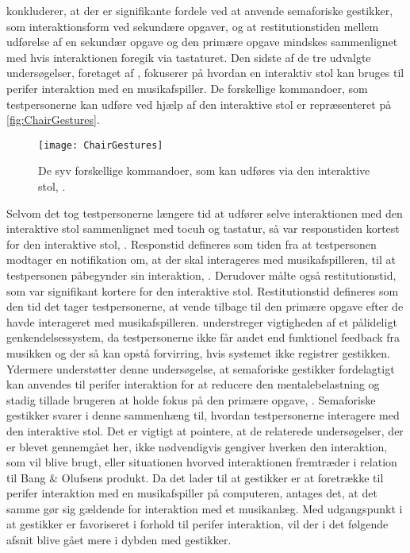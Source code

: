 \textcite[s. 1964]{PDF:AStudyOnTheUseOfSemaphoricGestures} konkluderer, at der er signifikante fordele ved at anvende semaforiske gestikker, som interaktionsform ved sekundære opgaver, og at restitutionstiden mellem udførelse af en sekundær opgave og den primære opgave mindskes sammenlignet med hvis interaktionen foregik via tastaturet.\blankline
%
Den sidste af de tre udvalgte undersøgelser, foretaget af \textcite[ss. 6-9]{PDF:AChairAsUbiquitousInputDevice}, fokuserer på hvordan en interaktiv stol kan bruges til perifer interaktion med en musikafspiller. De forskellige kommandoer, som testpersonerne kan udføre ved hjælp af den interaktive stol er repræsenteret på \autoref{fig:ChairGestures}. 
%
\begin{figure}[H]
	\centering
	\texttt{[image: ChairGestures]}
	\caption{De syv forskellige kommandoer, som kan udføres via den interaktive stol, \parencite[s. 3]{PDF:AChairAsUbiquitousInputDevice}.}
	\label{fig:ChairGestures}
\end{figure}
\noindent
%
Selvom det tog testpersonerne længere tid at udfører selve interaktionen med den interaktive stol sammenlignet med tocuh og tastatur, så var responstiden kortest for den interaktive stol, \textcite[s. 7]{PDF:AChairAsUbiquitousInputDevice}. Responstid defineres som tiden fra at testpersonen modtager en notifikation om, at der skal interageres med musikafspilleren, til at testpersonen påbegynder sin interaktion, \parencite[s. 6]{PDF:AChairAsUbiquitousInputDevice}. Derudover målte \textcite[s. 7]{PDF:AChairAsUbiquitousInputDevice} også restitutionstid, som var signifikant kortere for den interaktive stol. Restitutionstid defineres som den tid det tager testpersonerne, at vende tilbage til den primære opgave efter de havde interageret med musikafspilleren. \textcite[s. 8]{PDF:AChairAsUbiquitousInputDevice} understreger vigtigheden af et pålideligt genkendelsessystem, da testpersonerne ikke får andet end funktionel feedback fra musikken og der så kan opstå forvirring, hvis systemet ikke registrer gestikken. Ydermere understøtter denne undersøgelse, at semaforiske gestikker fordelagtigt kan anvendes til perifer interaktion for at reducere den mentalebelastning og stadig tillade brugeren at holde fokus på den primære opgave, \parencite[s. 8]{PDF:AChairAsUbiquitousInputDevice}. Semaforiske gestikker svarer i denne sammenhæng til, hvordan testpersonerne interagere med den interaktive stol. \blankline
%
Det er vigtigt at pointere, at de relaterede undersøgelser, der er blevet gennemgået her, ikke nødvendigvis gengiver hverken den interaktion, som vil blive brugt, eller situationen hvorved interaktionen fremtræder i relation til Bang $\&$ Olufsens produkt. Da det lader til at gestikker er at foretrække til perifer interaktion med en musikafspiller på computeren, antages det, at det samme gør sig gældende for interaktion med et musikanlæg. Med udgangspunkt i at gestikker er favoriseret i forhold til perifer interaktion, vil der i det følgende afsnit blive gået mere i dybden med gestikker. 


